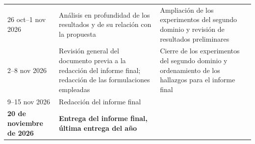 {\begin{longtable}{P{0.19}P{0.47}P{0.34}}
26 oct--1 nov 2026 & Análisis en profundidad de los resultados y de su relación con la propuesta & Ampliación de los experimentos del segundo dominio y revisión de resultados preliminares\\
2--8 nov 2026 & Revisión general del documento previa a la redacción del informe final; redacción de las formulaciones empleadas & Cierre de los experimentos del segundo dominio y ordenamiento de los hallazgos para el informe final\\
9--15 nov 2026 & Redacción del informe final & \\
\midrule
\textbf{20 de noviembre de 2026} & \textbf{Entrega del informe final, última entrega del año} & \\
\bottomrule
\end{longtable}
}
